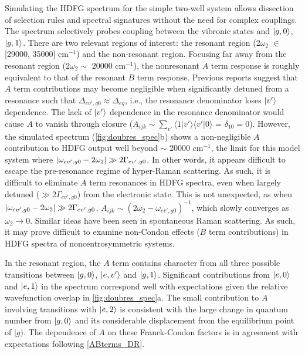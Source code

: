 \documentclass[aip, jcp, reprint, twocolumn]{revtex4-2}
\begin{document}
Simulating the HDFG spectrum for the simple two-well system allows dissection of selection rules and spectral signatures without the need for complex couplings.
The spectrum selectively probes coupling between the vibronic states and $\ket{g,0}$, $\ket{g,1}$.
There are two relevant regions of interest: the resonant region (2$\omega_2$ $\in$ [29000, 35000] cm$^{-1}$) and the non-resonant region.
Focusing far away from the resonant region ($2\omega_2 \sim$ 20000 cm$^{-1}$), the nonresonant $A$ term response is roughly equivalent to that of the resonant $B$ term response. 
Previous reports suggest that $A$ term contributions may become negligible when significantly detuned from a resonance such that $\Delta_{ev', g0} \approx \Delta_{eg}$, i.e., the resonance denominator loses $\ket{v'}$ dependence. \cite{Neddersen1989}
The lack of $\ket{v'}$ dependence in the resonance denominator would cause $A$ to vanish through closure ($A_{ijk} \sim \sum_{v'} \langle 1|v' \rangle \langle v'|0\rangle$ = $\delta_{10} = 0$).
However, the simulated spectrum (\autoref{fig:doubres_spec}b) shows a non-negligible $A$ contribution to HDFG output well beyond $\sim$ 20000 cm$^{-1}$, the limit for this model system where $\abs{\omega_{ev',g0} - 2\omega_2} \gg 2\Gamma_{ev',g0}$.
In other words, it appears difficult to escape the pre-resonance regime of hyper-Raman scattering.
As such, it is difficult to eliminate $A$ term resonances in HDFG spectra, even when largely detuned ($\gg 2\Gamma_{ev',g0}$) from the electronic state. 
This is not unexpected, as when $\abs{\omega_{ev',g0} - 2\omega_2} \gg 2\Gamma_{ev',g0}$, $A_{ijk} \sim \left(2\omega_2 - \omega_{ev',g0}\right)^{-1}$, which slowly converges as $\omega_2 \rightarrow 0$.
Similar ideas have been seen in spontaneous Raman scattering. \cite{Warshel1977, Li1990, Gong2015}
As such, it may prove difficult to examine non-Condon effects ($B$ term contributions) in HDFG spectra of noncentrosymmetric systems. 

In the resonant region, the $A$ term contains character from all three possible transitions between $\ket{g,0}$, $\ket{e,v'}$ and $\ket{g,1}$. 
Significant contributions from $\ket{e,0}$ and $\ket{e,1}$ in the spectrum correspond well with expectations given the relative wavefunction overlap in \autoref{fig:doubres_spec}a. 
The small contribution to $A$ involving transitions with $\ket{e,2}$ is consistent with the large change in quantum number from $\ket{g,0}$ and its considerable displacement from the equilibrium point of $|g)$.
The dependence of $A$ on these Franck-Condon factors is in agreement with expectations following \autoref{ABterms_DR}. 
\end{document}
